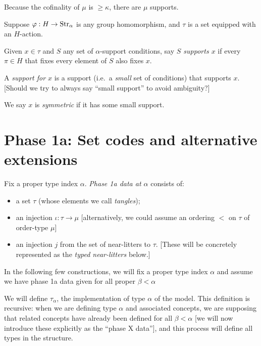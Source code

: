 \begin{lemma}
\label {lem:count-supports}
Because the cofinality of $\mu$ is $\geq \kappa$, there are $\mu$ supports.
\end{lemma}

\begin{definition}
\label{def:support-of}
  Suppose $\varphi : H \to \mathrm{Str}_\alpha$ is any group homomorphism, and $\tau$ is a set equipped with an $H$-action.

  Given $x \in \tau$ and $S$ any set of $\alpha$-support conditions, say \emph{$S$ supports $x$} if every $\pi \in H$ that fixes every element of $S$ also fixes $x$.

  A \emph{support for $x$} is a support (i.e.\ a \emph{small} set of conditions) that supports $x$. [Should we try to always say “small support” to avoid ambiguity?]

  We say $x$ is \emph{symmetric} if it has some small support.
\end{definition}

\section{Phase 1a: Set codes and alternative extensions}


\begin{definition}
\label {def:phase-1a-data}
Fix a proper type index $\alpha$.  \emph{Phase 1a data at $\alpha$} consists of:

\begin{itemize}
  \item a set $\tau$ (whose elements we call \emph{tangles});
  \item an injection $\iota : \tau \to \mu$ [alternatively, we could assume an ordering $<$ on $\tau$ of order-type $\mu$]
  \item an injection $j$ from the set of near-litters to $\tau$. [These will be concretely represented as the \emph{typed near-litters} below.]
\end{itemize}

In the following few constructions, we will fix a proper type index $\alpha$ and assume we have phase 1a data given for all proper $\beta < \alpha$
\end{definition}

We will define $\tau_\alpha$, the implementation of type $\alpha$ of the model.  This definition is recursive:  when we are defining type $\alpha$ and associated concepts, we are supposing that related concepts have already been defined for all $\beta<\alpha$ [we will now introduce these explicitly as the “phase X data”], and this process will define all types in the structure.

